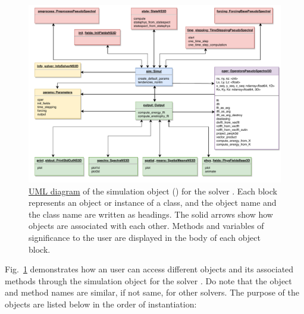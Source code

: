 %


\begin{figure}[htp]
\centering
\includegraphics[width=\linewidth]{Fig/fig_simul_obj}
\caption{%
\href{https://www.uml-diagrams.org}{UML diagram} of the simulation
object () for the solver
.
%
Each block represents an object or instance of a class, and the object name
and the class name are written as headings. The solid arrows show how objects are
associated with each other.
%
Methods and variables of significance to the user are displayed in the body of
each object block.}
\label{fig:simul}
\end{figure}

Fig.~\ref{fig:simul} demonstrates how an user can access different objects and
its associated methods through the simulation object for the solver
. Do note that the object and method names
are similar, if not same, for other solvers. The purpose of the objects are
listed below in the order of instantiation:

